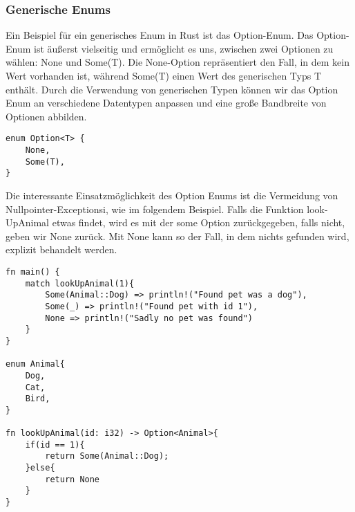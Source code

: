 \documentclass[a4paper, 1ppt]{article}
\begin{document}
\subsubsection{Generische Enums}
Ein Beispiel für ein generisches Enum in Rust ist das Option-Enum.
Das Option-Enum ist äußerst vielseitig und ermöglicht es uns, zwischen zwei Optionen zu wählen: None und Some(T). Die None-Option repräsentiert den Fall, in dem kein Wert vorhanden ist, während Some(T) einen Wert des generischen Typs T enthält. Durch die Verwendung von generischen Typen können wir das Option Enum an verschiedene Datentypen anpassen und eine große Bandbreite von Optionen abbilden.
\begin{verbatim}
enum Option<T> {
	None,
	Some(T),
}
\end{verbatim}
Die interessante Einsatzmöglichkeit des Option Enums ist die Vermeidung von Nullpointer-Exceptionsi, wie im folgendem Beispiel.
Falls die Funktion look-UpAnimal etwas findet, wird es mit der some Option zurückgegeben, falls nicht, geben wir None zurück. Mit None kann so der Fall, in dem nichts gefunden wird, explizit behandelt werden.
\newpage
\begin{verbatim}
fn main() {
    match lookUpAnimal(1){
        Some(Animal::Dog) => println!("Found pet was a dog"),
        Some(_) => println!("Found pet with id 1"),
        None => println!("Sadly no pet was found")
    }
}

enum Animal{
    Dog,
    Cat,
    Bird,
}

fn lookUpAnimal(id: i32) -> Option<Animal>{
    if(id == 1){
        return Some(Animal::Dog);
    }else{
        return None
    }
}
\end{verbatim}
\end{document}

